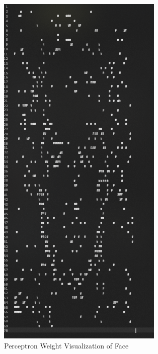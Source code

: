 \documentclass[11pt]{article}
\begin{document}
		\begin{figure}[H]
			\centering
			\includegraphics[scale=0.4]{Weight Visualization Face.jpg}
			\caption{Perceptron Weight Visualization of Face}\label{fig:1}
		\end{figure}
\end{document}

